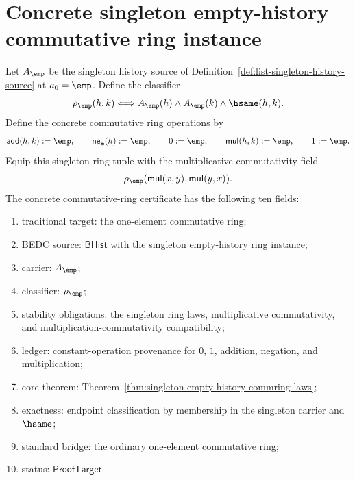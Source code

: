 \section{Concrete singleton empty-history commutative ring instance}
\label{sec:commring-concrete-singleton-instance}

\begin{definition}
\label{def:singleton-empty-history-commring-instance}
Let $A_{\emp}$ be the singleton history source of
Definition~\ref{def:list-singleton-history-source} at $a_0=\emp$. Define the
classifier
$$
\rho_{\emp}(h,k)\Longleftrightarrow
A_{\emp}(h)\land A_{\emp}(k)\land\hsame(h,k).
$$
Define the concrete commutative ring operations by
$$
\mathsf{add}(h,k):=\emp,\qquad
\mathsf{neg}(h):=\emp,\qquad
0:=\emp,\qquad
\mathsf{mul}(h,k):=\emp,\qquad
1:=\emp.
$$
Equip this singleton ring tuple with the multiplicative commutativity field
$$
\rho_{\emp}(\mathsf{mul}(x,y),\mathsf{mul}(y,x)).
$$
The concrete commutative-ring certificate has the following ten fields:
\begin{enumerate}
  \item traditional target: the one-element commutative ring;
  \item BEDC source: $\mathsf{BHist}$ with the singleton empty-history ring instance;
  \item carrier: $A_{\emp}$;
  \item classifier: $\rho_{\emp}$;
  \item stability obligations: the singleton ring laws, multiplicative commutativity, and multiplication-commutativity compatibility;
  \item ledger: constant-operation provenance for $0$, $1$, addition, negation, and multiplication;
  \item core theorem: Theorem~\ref{thm:singleton-empty-history-commring-laws};
  \item exactness: endpoint classification by membership in the singleton carrier and $\hsame$;
  \item standard bridge: the ordinary one-element commutative ring;
  \item status: $\mathsf{ProofTarget}$.
\end{enumerate}
\end{definition}

